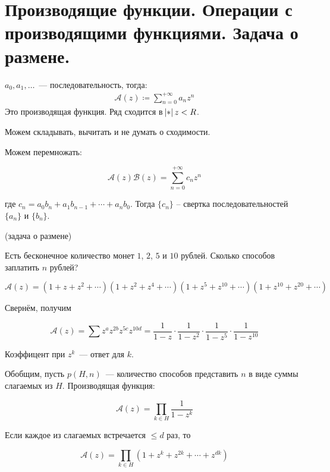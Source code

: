 \section{Производящие функции. Операции с производящими функциями. Задача о размене.}

\begin{definition}
    $a_0, a_1, \ldots$~--- последовательность,
    тогда: 
    \begin{gather*}
        \mathscr A(z) \coloneqq \sum\limits_{n=0}^{+\infty} a_nz^n
    \end{gather*}
    Это производящая функция. Ряд сходится в $\abs{z} < R$. 
\end{definition}

\begin{observation}
    Можем складывать, вычитать и не думать о сходимости.
\end{observation}

\begin{observation}
    Можем перемножать:

    \[
        \mathscr A(z) \mathscr B(z) = \sum\limits_{n=0}^{+\infty}
        c_nz^n
    \]

    где $c_n = a_0b_n + a_1b_{n-1} + \cdots + a_nb_0$. Тогда $\{c_n\}$ -- свертка последовательностей $\{a_n\}$ и $\{b_n\}$. 
\end{observation}

\begin{example} \; (задача о размене)

    Есть бесконечное количество монет $1$, $2$, $5$ и $10$ рублей.
    Сколько способов заплатить $n$ рублей?

    \[
        \mathscr A(z) =
        \left(1 + z + z^2 + \cdots\right)
        \left(1 + z^2 + z^4 + \cdots\right)
        \left(1 + z^5 + z^{10} + \cdots\right)
        \left(1 + z^{10} + z^{20} + \cdots\right)
    \]

    Свернём, получим

    \[
        \mathscr A(z) = \sum z^az^{2b}z^{5c}z^{10d}
        = \frac{1}{1-z}\cdot\frac{1}{1-z^2}\cdot
        \frac{1}{1-z^5}\cdot\frac{1}{1-z^{10}}
    \]

    Коэффицент при $z^k$~--- ответ для $k$.

    Обобщим, пусть $p(H, n)$~--- количество способов
    представить $n$ в виде суммы слагаемых из $H$.
    Производящая функция:

    \[
        \mathscr A(z) = \prod_{k\in H} \frac{1}{1-z^k}
    \]

    Если каждое из слагаемых встречается $\le d$ раз,
    то

    \[
        \mathscr A(z) = \prod_{k\in H} \left(
        1+z^k+z^{2k}+\cdots+z^{dk}
        \right)
    \]
\end{example}

\newpage


